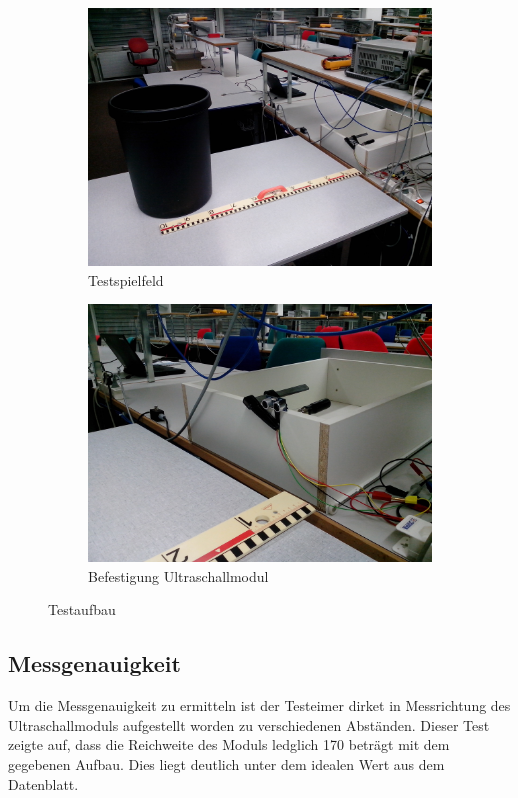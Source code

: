 \begin{figure}[h!]
	\centering
	\begin{subfigure}[b]{0.45\textwidth}
		\includegraphics[width=\textwidth]{../../fig/HC-SR04_01.jpg}
		\caption{Testspielfeld}
	\end{subfigure}
	\begin{subfigure}[b]{0.45\textwidth}
		\includegraphics[width=\textwidth]{../../fig/HC-SR04_02.jpg}
		\caption{Befestigung Ultraschallmodul}
	\end{subfigure}
	\caption{Testaufbau}
	\label{fig:testaufbau_hcsr04}
\end{figure}

\subsection{Messgenauigkeit}
Um die Messgenauigkeit zu ermitteln ist der Testeimer dirket in Messrichtung
des Ultraschallmoduls aufgestellt worden zu verschiedenen Abständen. Dieser
Test zeigte auf, dass die Reichweite des Moduls ledglich 170 beträgt mit dem
gegebenen Aufbau. Dies liegt deutlich unter dem idealen Wert aus dem 
Datenblatt.


